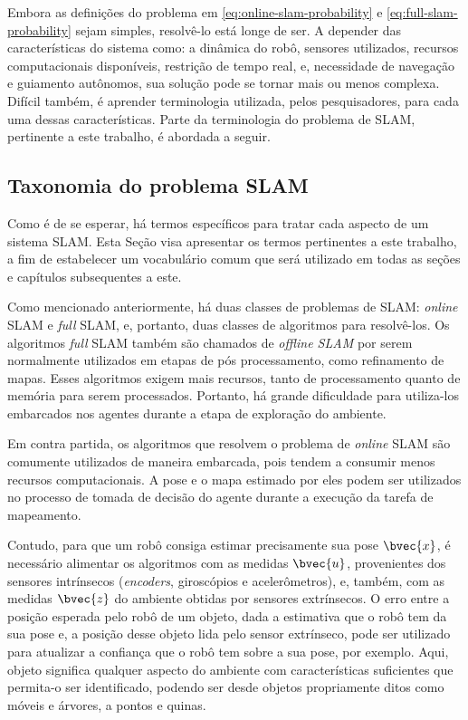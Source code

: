 Embora as definições do problema em \ref{eq:online-slam-probability} e 
\ref{eq:full-slam-probability} sejam simples, resolvê-lo está longe de ser. 
A depender das características do sistema como: a dinâmica do robô, sensores utilizados, recursos computacionais disponíveis, restrição de tempo real, e, 
necessidade de navegação e guiamento autônomos, sua solução pode se tornar mais 
ou menos complexa. Difícil também, é aprender terminologia utilizada, pelos 
pesquisadores, para cada uma dessas características. Parte da terminologia do problema de SLAM,
pertinente a este trabalho, é abordada a seguir.

\subsection*{Taxonomia do problema SLAM}
Como é de se esperar, há termos específicos para tratar cada aspecto de um 
sistema SLAM. Esta Seção visa apresentar os termos pertinentes a este trabalho, 
a fim de estabelecer um vocabulário comum que será utilizado em todas as seções 
e capítulos subsequentes a este.

Como mencionado anteriormente, há duas classes de problemas de SLAM: 
\textit{online} SLAM e \textit{full} SLAM, e, portanto, duas classes de 
algoritmos para resolvê-los. Os algoritmos \textit{full} SLAM também são chamados 
de \emph{offline SLAM} por serem normalmente utilizados em etapas de pós 
processamento, como refinamento de mapas. Esses algoritmos exigem mais 
recursos, tanto de processamento quanto de memória para serem processados. 
Portanto, há grande dificuldade para utiliza-los embarcados nos agentes durante 
a etapa de exploração do ambiente.

Em contra partida, os algoritmos que resolvem o problema de \textit{online} 
SLAM são comumente utilizados de maneira embarcada, pois tendem a 
consumir menos recursos computacionais. A pose e o mapa estimado por eles podem 
ser utilizados no processo de tomada de decisão do agente durante a execução da 
tarefa de mapeamento. 

Contudo, para que um robô consiga estimar precisamente sua pose $\bvec{x}$, é 
necessário alimentar os algoritmos com as medidas $\bvec{u}$, provenientes dos 
sensores intrínsecos (\textit{encoders}, giroscópios e acelerômetros), e, 
também, com as medidas $\bvec{z}$ do ambiente obtidas por sensores extrínsecos. O erro 
entre a posição esperada pelo robô de um objeto, dada a estimativa que o robô tem da sua pose e, a posição desse objeto lida pelo sensor extrínseco, pode ser 
utilizado para atualizar a confiança que o robô tem sobre a sua pose, por 
exemplo. Aqui, objeto significa qualquer aspecto do ambiente com características 
suficientes que permita-o ser identificado, podendo ser desde objetos
propriamente ditos como móveis e árvores, a pontos e quinas.

